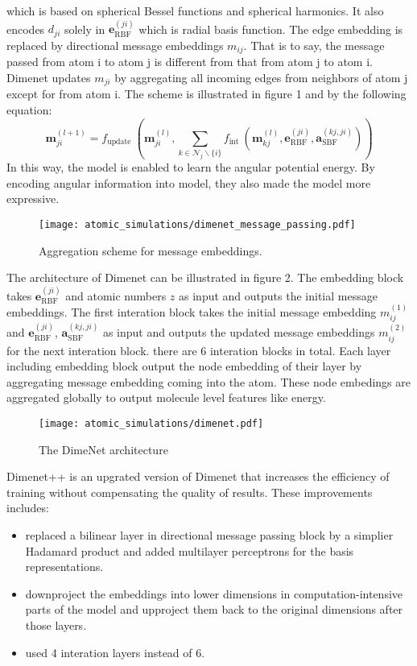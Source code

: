 which is based on spherical Bessel functions and spherical harmonics. 
It also encodes $d_{ji}$ solely in $\boldsymbol{e}_{\mathrm{RBF}}^{(j i)}$ which is radial 
basis function.  The edge embedding is replaced by directional message embeddings $m_{ij}$. 
That is to say, the message passed from atom i to atom j is different from that from atom j to atom i. 
Dimenet updates $m_{ji}$ by aggregating all incoming edges from neighbors of atom j except for from atom 
i. The scheme is illustrated in figure 1 and by the following equation:
\begin{equation}
    \boldsymbol{m}_{j i}^{(l+1)}=f_{\text {update }}\left(\boldsymbol{m}_{j i}^{(l)}, \sum_{k \in \mathcal{N}_{j} \backslash\{i\}} f_{\text {int }}\left(\boldsymbol{m}_{k j}^{(l)}, \boldsymbol{e}_{\mathrm{RBF}}^{(j i)}, \boldsymbol{a}_{\mathrm{SBF}}^{(k j, j i)}\right)\right)
\end{equation}
In this way, the model is enabled to learn the angular potential energy. By encoding angular information 
into model, they also made the model more expressive.\\
\begin{figure}[H]
    \centering
    \texttt{[image: atomic\_simulations/dimenet\_message\_passing.pdf]}
    \caption{Aggregation
    scheme for message
    embeddings. \cite*{DBLP:journals/corr/abs-2003-03123}}
  \end{figure}
The architecture of Dimenet can be illustrated in figure 2. 
The embedding block takes $\boldsymbol{e}_{\mathrm{RBF}}^{(j i)}$ and 
atomic numbers $z$ as input and outputs the initial message embeddings. 
The first interation block takes the initial message embedding $m_{ij}^{(1)}$ 
and $\boldsymbol{e}_{\mathrm{RBF}}^{(j i)}$, $\boldsymbol{a}_{\mathrm{SBF}}^{(k j, j i)}$ 
as input and outputs the updated message embeddings $m_{ij}^{(2)}$ for the next interation 
block. there are 6 interation blocks in total. Each layer including embedding block output 
the node embedding of their layer by aggregating message embedding coming into the atom. 
These node embedings are aggregated globally to output molecule level features like energy.\\
\begin{figure}[H]
    \centering
    \texttt{[image: atomic\_simulations/dimenet.pdf]}
    \caption{The DimeNet architecture \cite*{DBLP:journals/corr/abs-2003-03123}}
  \end{figure}
Dimenet++ is an upgrated version of Dimenet that increases the efficiency of training 
without compensating the quality of results. These improvements includes: \\
\begin{itemize}
    \item replaced a bilinear layer in directional message passing block by a 
    simplier Hadamard product and added multilayer perceptrons for the basis representations.
    \item downproject the embeddings into lower dimensions in computation-intensive 
    parts of the model and upproject them back to the original dimensions after those layers.
    \item used 4 interation layers instead of 6. 
\end{itemize}

